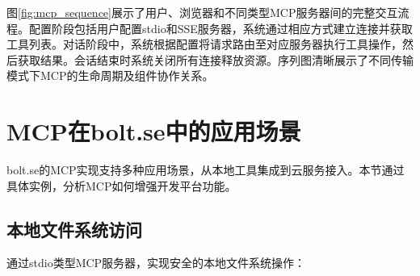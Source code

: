     
    
    
    
    
    

图\ref{fig:mcp_sequence}展示了用户、浏览器和不同类型MCP服务器间的完整交互流程。配置阶段包括用户配置stdio和SSE服务器，系统通过相应方式建立连接并获取工具列表。对话阶段中，系统根据配置将请求路由至对应服务器执行工具操作，然后获取结果。会话结束时系统关闭所有连接释放资源。序列图清晰展示了不同传输模式下MCP的生命周期及组件协作关系。

\section{MCP在bolt.se中的应用场景}

bolt.se的MCP实现支持多种应用场景，从本地工具集成到云服务接入。本节通过具体实例，分析MCP如何增强开发平台功能。

\subsection{本地文件系统访问}

通过stdio类型MCP服务器，实现安全的本地文件系统操作：

